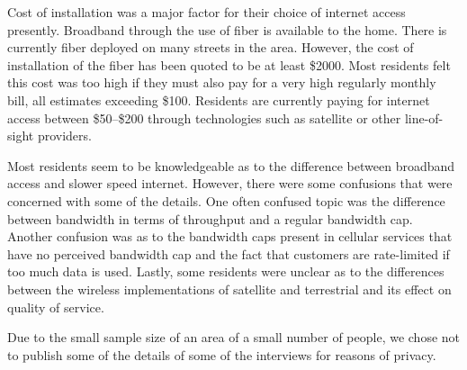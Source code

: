 Cost of installation was a major factor for their choice of internet access presently. Broadband
through the use of fiber is available to the home. There is currently fiber deployed on many
streets in the area. However, the cost of installation of the fiber has been quoted to be at least \$2000.
Most residents felt this cost was too high if they must also pay for a very high regularly monthly bill, all
estimates exceeding \$100. Residents are currently paying for internet access between \$50--\$200
through technologies such as satellite or other line-of-sight providers.

Most residents seem to be knowledgeable as to the difference between broadband access and slower speed internet.
However, there were some confusions that were concerned with some of the details. One often confused topic was
the difference between bandwidth in terms of throughput and a regular bandwidth cap. Another confusion was
as to the bandwidth caps present in cellular services that have no perceived bandwidth cap and the fact that
customers are rate-limited if too much data is used. Lastly, some residents were unclear as to the differences
between the wireless implementations of satellite and terrestrial and its effect on quality of service.

Due to the small sample size of an area of a small number of people,
we chose not to publish some of the details of some of the
interviews for reasons of privacy.


